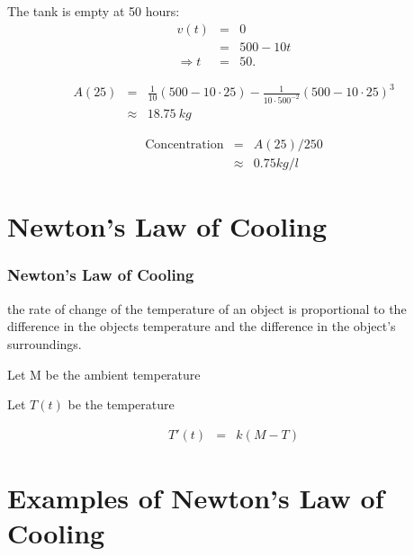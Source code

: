 \begin{frame}

  The tank is empty at 50 hours:
  \begin{eqnarray*}
    v(t) & = & 0 \\
    & = & 500-10t \\
    \Rightarrow t & = & 50.
  \end{eqnarray*}

  \begin{eqnarray*}
    A(25) & = & \frac{1}{10} (500-10\cdot 25) - \frac{1}{10\cdot500^{-2}} (500-10\cdot 25)^3 \\
    & \approx & 18.75 ~ kg
  \end{eqnarray*}

  \begin{eqnarray*}
    \mathrm{Concentration} & = & A(25)/250 \\
    & \approx & 0.75 kg/l
  \end{eqnarray*}

\end{frame}

\section{Newton's Law of Cooling}

\begin{frame}
  \frametitle{Newton's Law of Cooling}

  the rate of change of the temperature of an object is proportional
  to the difference in the objects temperature and the difference in
  the object's surroundings.

  Let M be the ambient temperature

  Let $T(t)$ be the temperature

  \begin{eqnarray*}
    T'(t) & = & k (M-T)
  \end{eqnarray*}


\end{frame}

\section{Examples of Newton's Law of Cooling}

